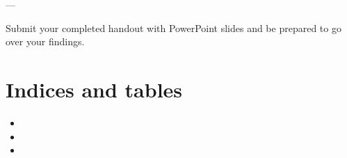 \documentclass[letterpaper,10pt,english]{sphinxmanual}
\begin{document}
\sphinxAtStartPar
—

\sphinxAtStartPar
{} Submit your completed handout with PowerPoint slides and be prepared to go over your findings.


\chapter{Indices and tables}
\label{\detokenize{index:indices-and-tables}}\begin{itemize}
\item {} 
\sphinxAtStartPar
{}

\item {} 
\sphinxAtStartPar
{}

\item {} 
\sphinxAtStartPar
{}

\end{itemize}



\renewcommand{\indexname}{Index}
\printindex
\end{document}
